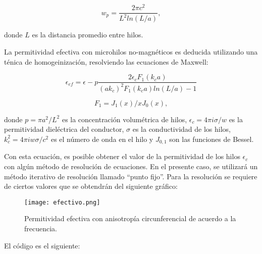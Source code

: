 \documentclass[12pt,letterpaper]{report}
\numberwithin{equation}{section}
\begin{document}
\begin{equation}
w_{p}=\frac{2 \pi c^2}{L^2 ln(L/a)},
\end{equation}

\noindent donde $L$ es la distancia promedio entre hilos.

La permitividad efectiva con microhilos no-magnéticos es deducida utilizando una ténica de homogeinización, resolviendo las ecuaciones de Maxwell:

\begin{equation}
\epsilon_{ef}=\epsilon -p \frac{2\epsilon_{c} F_{1} (k_{c}a)}{(ak_{c})^2F_{1}(k_{c}a) ln(L/a)-1}
\end{equation}

\begin{equation}
F_{1} =J_{1}(x)/xJ_{0}(x),
\end{equation}

\noindent donde $p=\pi a^2 / L^2$ es la concentración volumétrica de hilos, $\epsilon_{c} = 4 \pi i \sigma /w$ es la permitividad dieléctrica del conductor, $\sigma$ es la conductividad de los hilos, $k_{c}^2 = 4 \pi i w \sigma /c^2$ es el número de onda en el hilo y $J_{0,1}$ son las funciones de Bessel. \cite{Wire_theory_2}

Con esta ecuación, es posible obtener el valor de la permitividad de los hilos $\epsilon_{c}$ con algún método de resolución de ecuaciones. En el presente caso, se utilizará un método iterativo de resolución llamado ``punto fijo''. Para la resolución se requiere de ciertos valores que se obtendrán del siguiente gráfico:

\begin{figure}[H]
	\centering\texttt{[image: efectivo.png]}\\
	\caption{Permitividad efectiva con anisotropía circunferencial de acuerdo a la frecuencia.}
	\label{fig:efectivo}
\end{figure} 

El código es el siguiente:
\end{document}
